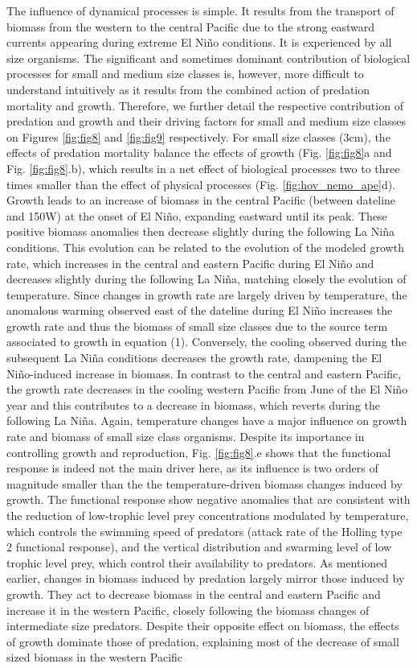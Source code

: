 The influence of dynamical processes is simple. It results from the transport of biomass from the western to the central Pacific due to the strong eastward currents appearing during extreme El Niño conditions. It is experienced by all size organisms. The significant and sometimes dominant contribution of biological processes for small and medium size classes is, however, more difficult to understand intuitively as it results from the combined action of predation mortality and growth. Therefore, we further detail the respective contribution of predation and growth and their driving factors for small and medium size classes on Figures \ref{fig:fig8} and \ref{fig:fig9} respectively. For small size classes (3cm), the effects of predation mortality balance the effects of growth (Fig. \ref{fig:fig8}a and Fig. \ref{fig:fig8}.b), which results in a net effect of biological processes two to three times smaller than the effect of physical processes (Fig. \ref{fig:hov_nemo_ape}d). Growth leads to an increase  of biomass in the central Pacific (between dateline and 150\degree{}W) at the onset of El Niño, expanding eastward until its peak. These positive biomass anomalies then decrease slightly during the following La Niña conditions. This evolution can be related to the evolution of the modeled growth rate, which increases in the central and eastern Pacific during El Niño and decreases slightly during the following La Niña, matching closely the evolution of temperature. Since changes in growth rate are largely driven by temperature, the anomalous warming observed east of the dateline during El Niño increases the growth rate and thus the biomass of small size classes due to the source term associated to growth in equation (1). Conversely, the cooling observed during the subsequent La Niña conditions decreases the growth rate, dampening the El Niño-induced increase in biomass. In contrast to the central and eastern Pacific, the growth rate decreases in the cooling western Pacific from June of the El Niño year and this contributes to a decrease in biomass, which reverts during the following La Niña. Again, temperature changes have a major influence on growth rate and biomass of small size class organisms. Despite its importance in controlling growth and reproduction, Fig. \ref{fig:fig8}.e shows that the functional response is indeed not the main driver here, as its influence is two orders of magnitude smaller than the the temperature-driven biomass changes induced by growth. The functional response show negative anomalies that are consistent with the reduction of low-trophic level prey concentrations modulated by temperature, which controls the swimming speed of predators (attack rate of the Holling type 2 functional response), and the vertical distribution and swarming level of low trophic level prey, which control their availability to predators. As mentioned earlier, changes in biomass induced by predation largely mirror those induced by growth. They act to decrease biomass in the central and eastern Pacific and increase it in the western Pacific, closely following the biomass changes of intermediate size predators. Despite their opposite effect on biomass, the effects of growth dominate those of predation, explaining most of the decrease of small sized biomass in the western Pacific 